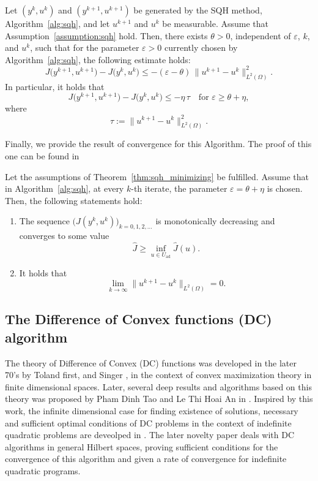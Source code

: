 \begin{theorem}\label{thm:sqh_minimizing}
Let $(y^k,u^k)$ and $(y^{k+1},u^{k+1})$ be generated by the SQH method,
Algorithm~\ref{alg:sqh}, and let $u^{k+1}$ and $u^k$ be measurable.
Assume that Assumption~\ref{assumption:sqh} hold.
Then, there exists $\theta>0$, independent of $\varepsilon$, $k$, and $u^k$,
such that for the parameter $\varepsilon>0$ currently chosen by
Algorithm~\ref{alg:sqh}, the following estimate holds:
\begin{equation}\label{eq:sqh_descent}
J\big(y^{k+1},u^{k+1}\big) - J\big(y^k,u^k\big)
\le -(\varepsilon-\theta)\,\|u^{k+1}-u^k\|_{L^2(\Omega)}^2 .
\end{equation}
In particular, it holds that
\[
J\big(y^{k+1},u^{k+1}\big) - J\big(y^k,u^k\big)
\le -\eta\,\tau
\quad \text{for } \varepsilon \ge \theta+\eta,
\]
where
\[
\tau := \|u^{k+1}-u^k\|_{L^2(\Omega)}^2 .
\]
\end{theorem}

Finally, we provide the result of convergence for this Algorithm. The proof of this one can be found in \cite[Theorem 7.4]{borzi2023}
\begin{theorem}\label{thm:sqh_convergence}
Let the assumptions of Theorem~\ref{thm:sqh_minimizing} be fulfilled.
Assume that in Algorithm~\ref{alg:sqh}, at every $k$-th iterate,
the parameter $\varepsilon=\theta+\eta$ is chosen.
Then, the following statements hold:
\begin{enumerate}[label=\textup{(\alph*)}]
\item
The sequence $\big(J(y^k,u^k)\big)_{k=0,1,2,\dots}$ is monotonically decreasing
and converges to some value
\[
\hat J \ge \inf_{u\in U_{\mathrm{ad}}} \hat J(u).
\]

\item
It holds that
\[
\lim_{k\to\infty} \|u^{k+1}-u^k\|_{L^2(\Omega)} = 0.
\]
\end{enumerate}
\end{theorem}

\subsection{The Difference of Convex functions (DC) algorithm}

The theory of Difference of Convex  (DC) functions was developed in the later 70's by Toland first, 
and Singer \cite{toland, singer}, in the context of convex maximization theory in finite dimensional 
spaces. Later, several deep results and algorithms based on this theory was proposed by Pham Dinh Tao 
and Le Thi Hoai An in \cite{tao}. Inspired by this work, the infinite dimensional case for finding 
existence of solutions, necessary and sufficient optimal conditions of DC problems in the context of 
indefinite quadratic problems are deveolped in \cite{bonnans, yen}. The later novelty paper \cite{lim} deals with DC algorithms in general Hilbert spaces, proving sufficient conditions for the convergence of this algorithm and given a rate of convergence for indefinite quadratic programs. 


